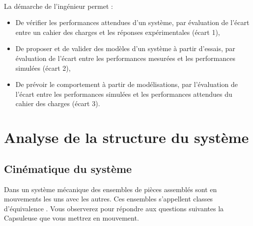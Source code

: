 

 \\

\graphicspath{{../../../img/}}
\begin{center}
\def\svgwidth{\columnwidth}

\end{center}

La démarche de l’ingénieur permet :
\begin{itemize}
 \item De vérifier les performances attendues d’un système, par évaluation de l’écart entre un cahier des charges et les réponses expérimentales (écart 1),
 \item De proposer et de valider des modèles d’un système à partir d’essais, par évaluation de l’écart entre les performances mesurées et les performances simulées (écart 2),
 \item De prévoir le comportement à partir de modélisations, par l’évaluation de l’écart entre les performances simulées et les performances attendues du cahier des charges (écart 3).
\end{itemize}



\newpage

\section{Analyse de la structure du système}

\subsection{Cinématique du système}

Dans un système mécanique des ensembles de pièces assemblés sont en mouvements les uns avec les autres. Ces ensembles s'appellent \og classes d'équivalence \fg. Vous observerez pour répondre aux questions suivantes la Capsuleuse que vous mettrez en mouvement.


